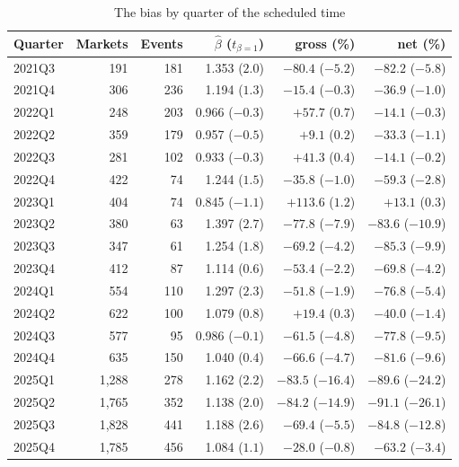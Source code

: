 \begin{table}[htbp]
\centering
\begin{threeparttable}
\caption{The bias by quarter of the scheduled time}\label{tab:xs-cal}
\scriptsize
\begin{tabular}{@{}lrrrrr@{}}
\toprule
Quarter & Markets & Events & $\hat\beta$ ($t_{\beta=1}$) & \LS{} gross (\%) & \LS{} net (\%) \\
\midrule
2021Q3 & 191 & 181 & 1.353 ($2.0$) & $-80.4$ ($-5.2$) & $-82.2$ ($-5.8$) \\
2021Q4 & 306 & 236 & 1.194 ($1.3$) & $-15.4$ ($-0.3$) & $-36.9$ ($-1.0$) \\
2022Q1 & 248 & 203 & 0.966 ($-0.3$) & $+57.7$ ($0.7$) & $-14.1$ ($-0.3$) \\
2022Q2 & 359 & 179 & 0.957 ($-0.5$) & $+9.1$ ($0.2$) & $-33.3$ ($-1.1$) \\
2022Q3 & 281 & 102 & 0.933 ($-0.3$) & $+41.3$ ($0.4$) & $-14.1$ ($-0.2$) \\
2022Q4 & 422 & 74 & 1.244 ($1.5$) & $-35.8$ ($-1.0$) & $-59.3$ ($-2.8$) \\
2023Q1 & 404 & 74 & 0.845 ($-1.1$) & $+113.6$ ($1.2$) & $+13.1$ ($0.3$) \\
2023Q2 & 380 & 63 & 1.397 ($2.7$) & $-77.8$ ($-7.9$) & $-83.6$ ($-10.9$) \\
2023Q3 & 347 & 61 & 1.254 ($1.8$) & $-69.2$ ($-4.2$) & $-85.3$ ($-9.9$) \\
2023Q4 & 412 & 87 & 1.114 ($0.6$) & $-53.4$ ($-2.2$) & $-69.8$ ($-4.2$) \\
2024Q1 & 554 & 110 & 1.297 ($2.3$) & $-51.8$ ($-1.9$) & $-76.8$ ($-5.4$) \\
2024Q2 & 622 & 100 & 1.079 ($0.8$) & $+19.4$ ($0.3$) & $-40.0$ ($-1.4$) \\
2024Q3 & 577 & 95 & 0.986 ($-0.1$) & $-61.5$ ($-4.8$) & $-77.8$ ($-9.5$) \\
2024Q4 & 635 & 150 & 1.040 ($0.4$) & $-66.6$ ($-4.7$) & $-81.6$ ($-9.6$) \\
2025Q1 & 1{,}288 & 278 & 1.162 ($2.2$) & $-83.5$ ($-16.4$) & $-89.6$ ($-24.2$) \\
2025Q2 & 1{,}765 & 352 & 1.138 ($2.0$) & $-84.2$ ($-14.9$) & $-91.1$ ($-26.1$) \\
2025Q3 & 1{,}828 & 441 & 1.188 ($2.6$) & $-69.4$ ($-5.5$) & $-84.8$ ($-12.8$) \\
2025Q4 & 1{,}785 & 456 & 1.084 ($1.1$) & $-28.0$ ($-0.8$) & $-63.2$ ($-3.4$) \\

\end{tabular}
\end{threeparttable}
\end{table}
